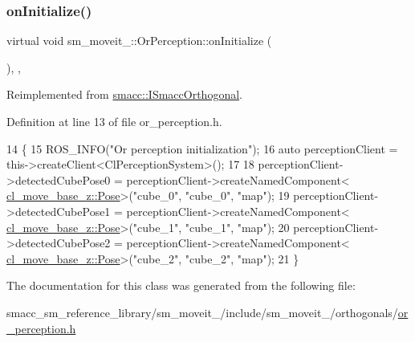 \subsubsection{\texorpdfstring{on\+Initialize()}{onInitialize()}}
{\footnotesize\ttfamily virtual void sm\+\_\+moveit\+\_\+::\+Or\+Perception\+::on\+Initialize (\begin{DoxyParamCaption}{ }\end{DoxyParamCaption})\hspace{0.3cm}{\ttfamily [inline]}, {\ttfamily [override]}, {\ttfamily [virtual]}}



Reimplemented from \hyperlink{classsmacc_1_1ISmaccOrthogonal_a6bb31c620cb64dd7b8417f8705c79c7a}{smacc\+::\+I\+Smacc\+Orthogonal}.



Definition at line 13 of file or\+\_\+perception.\+h.


\begin{DoxyCode}
14     \{
15         ROS\_INFO(\textcolor{stringliteral}{"Or perception initialization"});
16         \textcolor{keyword}{auto} perceptionClient = this->createClient<ClPerceptionSystem>();
17 
18         perceptionClient->detectedCubePose0 = perceptionClient->createNamedComponent<
      \hyperlink{classcl__move__base__z_1_1Pose}{cl\_move\_base\_z::Pose}>(\textcolor{stringliteral}{"cube\_0"}, \textcolor{stringliteral}{"cube\_0"}, \textcolor{stringliteral}{"map"});
19         perceptionClient->detectedCubePose1 = perceptionClient->createNamedComponent<
      \hyperlink{classcl__move__base__z_1_1Pose}{cl\_move\_base\_z::Pose}>(\textcolor{stringliteral}{"cube\_1"}, \textcolor{stringliteral}{"cube\_1"}, \textcolor{stringliteral}{"map"});
20         perceptionClient->detectedCubePose2 = perceptionClient->createNamedComponent<
      \hyperlink{classcl__move__base__z_1_1Pose}{cl\_move\_base\_z::Pose}>(\textcolor{stringliteral}{"cube\_2"}, \textcolor{stringliteral}{"cube\_2"}, \textcolor{stringliteral}{"map"});
21     \}
\end{DoxyCode}


The documentation for this class was generated from the following file\+:\begin{DoxyCompactItemize}
\item 
smacc\+\_\+sm\+\_\+reference\+\_\+library/sm\+\_\+moveit\+\_/include/sm\+\_\+moveit\+\_/orthogonals/\hyperlink{sm__moveit__2_2include_2sm__moveit__2_2orthogonals_2or__perception_8h}{or\+\_\+perception.\+h}\end{DoxyCompactItemize}
